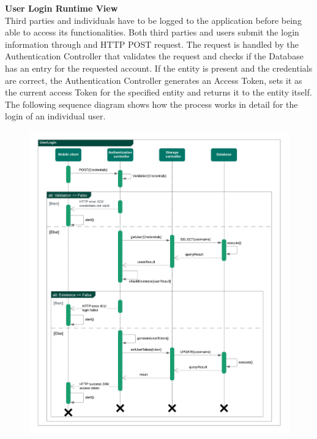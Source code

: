 \begin{legal}
\begin{legal}
\begin{figure}[H]
				\end{figure}
				
				\newpage
				\item \textbf{User Login Runtime View}\\
Third parties and individuals have to be logged to the application before being able to access its functionalities.
Both third parties and users submit the login information through and HTTP POST request.
The request is handled by the Authentication Controller that validates the request and checks if the Database has an entry for the requested account. If the entity is present and the credentials are correct, the Authentication Controller generates an Access Token, sets it as the current access Token for the specified entity and returns it to the entity itself.
The following sequence diagram shows how the process works in detail for the login of an individual user.\\
				\begin{figure}[H]
				\includegraphics[width=\linewidth]{images/seq_diagrams/userLoginSeq.png}\\
				\end{figure}
				

\end{legal}
\end{legal}
